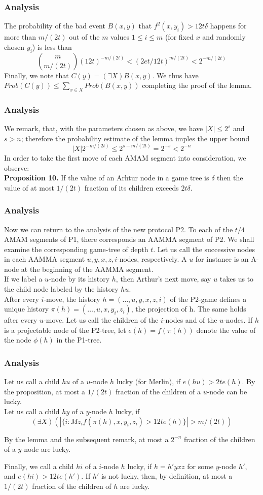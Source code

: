 \documentclass{beamer}
\begin{document}
\begin{frame}
\frametitle{Analysis}
The probability of the bad event $B(x, y)$ that $f^2(x, y_i) > 12t\delta$ happens for more than $m/(2t)$ out of the $m$ values $1 \leq i \leq m$ (for fixed $x$ and randomly chosen $y_i$) is less than $$\binom{m}{m/(2t)} (12t)^{-m/(2t)} < (2et/12t)^{m/(2t)} < 2 ^{-m/(2t)}$$
Finally, we note that $C(y) = (\exists X) B (x, y)$. We thus have $Prob(C(y)) \leq \sum _{x \in X} Prob(B(x, y))$ completing the proof of the lemma.\\
\end{frame}

\begin{frame}
\frametitle{Analysis}
We remark, that, with the parameters chosen as above, we have $|X| \leq 2^s$ and $s > n$; therefore the probability estimate of the lemma imples the upper bound 
$$|X| 2^{-m/(2t)} \leq 2^{s - m/(2t)} = 2^{-s} < 2^{-n}$$
In order to take the first move of each AMAM segment into consideration, we observe:\\
\textbf{Proposition 10.} If the value of an Arhtur node in a game tree is $\delta$ then the value of at most $1/(2t)$ fraction of its children exceeds $2t\delta$.
\end{frame}

\begin{frame}
\frametitle{Analysis}
Now we can return to the analysis of the new protocol P2. To each of the $t/4$ AMAM segments of P1, there corresponds an AAMMA segment of P2. We shall examine the corresponding game-tree of depth $t$. Let us call the successive nodes in each AAMMA segment $u, y, x, z, i$-nodes, respectively. A $u$ for instance is an A-node at the beginning of the AAMMA segment.\\
If we label a $u$-node by its history $h$, then Arthur's next move, say $u$ takes us to the child node labeled by the history $hu$.\\
After every $i$-move, the history $h = (\dots, u, y, x, z, i)$ of the P2-game defines a unique history $\pi(h) = (\ldots, u, x, y_i, z_i)$, the projection of h. The same holds after every $u$-move. Let us call the children of the $i$-nodes and of the $u$-nodes. If $h$ is a projectable node of the P2-tree, let $e(h) = f(\pi(h))$ denote the value of the node $\phi(h)$ in the P1-tree.
\end{frame}

\begin{frame}
\frametitle{Analysis}
Let us call a child $hu$ of a $u$-node $h$ lucky (for Merlin), if $e(hu) > 2te(h)$. By the proposition, at most a $1/(2t)$ fraction of the children of a $u$-node can be lucky.\\
Let us call a child $hy$ of a $y$-node $h$ lucky, if 
$$(\exists X)(|\{i : Mz_i f(\pi(h), x, y_i, z_i)> 12te(h)\}| > m/(2t))$$

By the lemma and the subsequent remark, at most a $2^{-n}$ fraction of the children of a $y$-node are lucky.

Finally, we call a child $hi$ of a $i$-node $h$ lucky, if $h = h'yxz$ for some $y$-node $h'$, and $e(hi) > 12te(h')$. If $h'$ is not lucky, then, by definition, at most a $1/(2t)$ fraction of the children of $h$ are lucky.
\end{frame}
\end{document}
